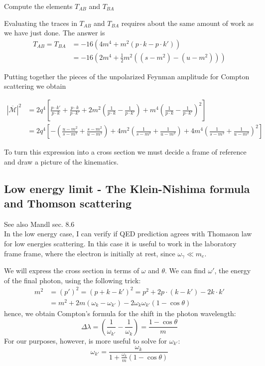 \documentclass[TheoreticalPhy_ModB.tex]{subfiles}
\begin{document}
\begin{exercise}
Compute the elements $T_{AB}$ and $T_{BA}$
\end{exercise}

Evaluating the traces in $T_{AB}$ and $T_{BA}$ requires about the same amount of work as we have just done. The answer is 
\begin{align*}
T_{AB}=T_{BA}&=-16\left(4m^4+m^2(p\cdot k-p\cdot k')\right)\\
&=-16\left(2m^4+\frac{1}2m^2((s-m^2)-(u-m^2))\right)
\end{align*}

Putting together the pieces of the unpolarized Feynman amplitude for Compton scattering we obtain

\begin{equation}\label{eqn:Compton-unpolarized-squared}\begin{split}
|\overline{\mathcal M}|^2&=2q^4\left[\frac{p\cdot k'}{p\cdot k}+\frac{p\cdot k}{p\cdot k'}+2m^2\left(\frac1{p\cdot k}-\frac1{p\cdot k'}\right)+m^4\left(\frac1{p\cdot k}-\frac1{p\cdot k'}\right)^2\right]\\
&=2q^4\left[-\left(\frac{u-m^2}{s-m^2}+\frac{s-m^2}{u-m^2}\right)+4m^2\left(\frac1{s-m^2}+\frac1{u-m^2}\right)+4m^4\left(\frac1{s-m^2}+\frac1{u-m^2}\right)^2\right]
\end{split}\end{equation}

To turn this expression into a cross section we must decide a frame of reference and draw a picture of the kinematics.

\subsection{Low energy limit - The Klein-Nishima formula and Thomson scattering}
\textsf{See also Mandl sec. 8.6}\\

In the low energy case, I can verify if QED prediction agrees with Thomason law for low energies scattering. In this case it is useful to work in the laboratory frame frame, where the electron is initially at rest, since $\omega_\gamma\ll m_e$.

\begin{figure}[H]
\centering

\end{figure}

We will express the cross section in terms of $\omega$ and $\theta$. We can find $\omega'$, the energy of the final photon, using the following trick:
\begin{align*}
m^2&=(p')^2=(p+k-k')^2=p^2+2p\cdot(k-k')-2k\cdot k'\\
&=m^2+2m(\omega_k-\omega_{k'})-2\omega_k\omega_{k'}(1-\cos\theta)
\end{align*}
hence, we obtain Compton's formula for the shift in the photon wavelength:
\[\Delta\lambda=\left(\frac1{\omega_{k'}}-\frac1{\omega_{k}}\right)=\frac{1-\cos\theta}{m}\]
For our purposes, however, is more useful to solve for $\omega_{k'}$:
\begin{equation}\label{eqn:QED-compton-energies-lab}
\omega_{k'}=\frac{\omega_k}{1+\frac{\omega_{k}}m(1-\cos\theta)}
\end{equation}
\end{document}
